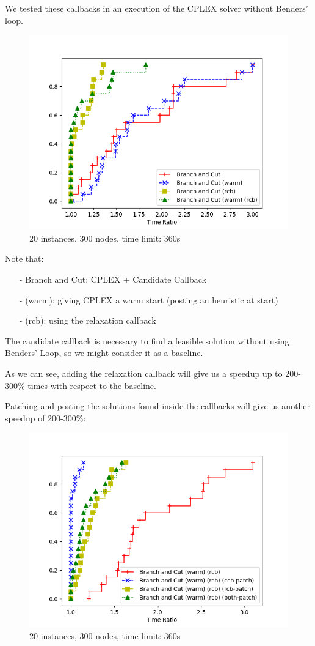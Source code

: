 We tested these callbacks in an execution of the CPLEX solver without Benders' loop.

\FloatBarrier
\begin{figure}[h]
    \centering
    \includegraphics*[width=.6\textwidth]{../plots/perfprof_bnc_times.png}
    \caption*{20 instances, 300 nodes, time limit: 360s}
\end{figure}
\FloatBarrier

Note that:
\begin{itemize}
    \item[-] Branch and Cut: CPLEX + Candidate Callback
    \item[-] (warm): giving CPLEX a warm start (posting an heuristic at start)
    \item[-] (rcb): using the relaxation callback
\end{itemize}

The candidate callback is necessary to find a feasible solution without using Benders' Loop, so we might consider it as a baseline.

As we can see, adding the relaxation callback will give us a speedup up to 200-300\% times with respect to the baseline.

Patching and posting the solutions found inside the callbacks will give us another speedup of 200-300\%:

\FloatBarrier
\begin{figure}[h]
    \centering
    \includegraphics*[width=.6\textwidth]{../plots/perfprof_bnc_patch_times.png}
    \caption*{20 instances, 300 nodes, time limit: 360s}
\end{figure}
\FloatBarrier

